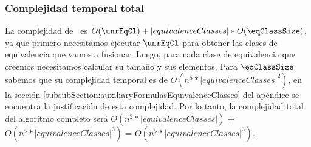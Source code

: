 
\subsubsection{Complejidad temporal total}

 La complejidad de \eqClassSizes \ es  $O(\unrEqCl) + |equivalenceClasses| * O(\eqClassSize)$, ya que primero necesitamos ejecutar $\unrEqCl$ para obtener las clases de equivalencia que vamos a fusionar. Luego, para cada clase de equivalencia que creemos necesitamos calcular su tamaño y sus elementos. Para  $\eqClassSize$ sabemos que su complejidad temporal es de $O(n^5 * |equivalenceClasses|^2)$, en la sección \ref{subsubSection:auxiliaryFormulasEquivalenceClasses} del apéndice se encuentra la justificación de esta complejidad. Por lo tanto, la complejidad total del algoritmo completo será $O(n^2 * |equivalenceClasses|)$ + $O(n^5 * |equivalenceClasses|^3)$ = $O(n^5 * |equivalenceClasses|^3)$.